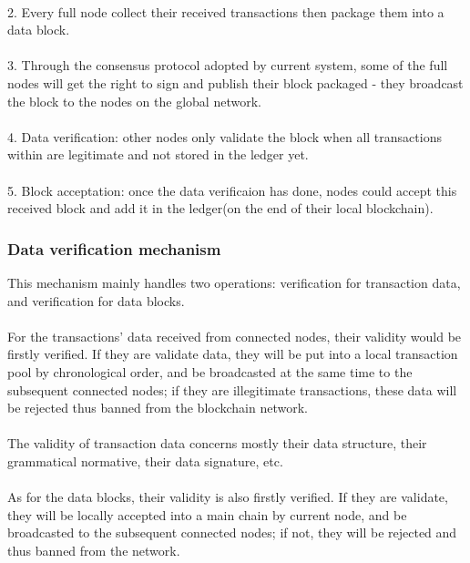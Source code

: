 \documentclass[doublespacing]{bmcart}
\begin{document}
\begin{CJK*}{UTF8}{gbsn}
\paragraph{} 2. Every full node collect their received transactions then package them into a data block.
\paragraph{} 3. Through the consensus protocol adopted by current system, some of the full nodes will get the right to sign and publish their block packaged - they broadcast the block to the nodes on the global network.
\paragraph{} 4. Data verification: other nodes only validate the block when all transactions within are legitimate and not stored in the ledger yet.
\paragraph{} 5. Block acceptation: once the data verificaion has done, nodes could accept this received block and add it in the ledger(on the end of their local blockchain).
\subsubsection*{Data verification mechanism}
This mechanism mainly handles two operations: verification for transaction data, and verification for data blocks.
\paragraph{} For the transactions' data received from connected nodes, their validity would be firstly verified. If they are validate data, they will be put into a local transaction pool by chronological order, and be broadcasted at the same time to the subsequent connected nodes; if they are illegitimate transactions, these data will be rejected thus banned from the blockchain network.
\paragraph{} The validity of transaction data concerns mostly their data structure, their grammatical normative, their data signature, etc. 
\paragraph{} As for the data blocks, their validity is also firstly verified. If they are validate, they will be locally accepted into a main chain by current node, and be broadcasted to the subsequent connected nodes; if not, they will be rejected and thus banned from the network.

\end{CJK*}
\end{document}
